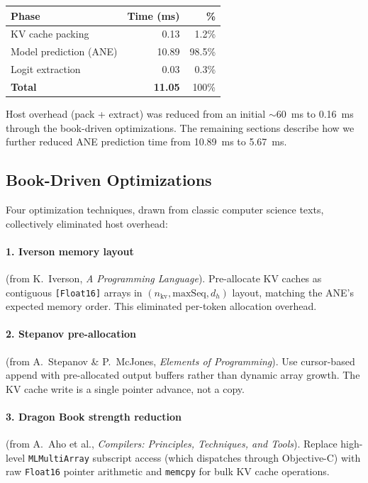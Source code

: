 \documentclass[11pt,twocolumn]{article}
\begin{document}
\begin{center}
\footnotesize
\begin{tabular}{lrr}
\toprule
\textbf{Phase} & \textbf{Time (ms)} & \textbf{\%} \\
\midrule
KV cache packing & 0.13 & 1.2\% \\
Model prediction (ANE) & 10.89 & 98.5\% \\
Logit extraction & 0.03 & 0.3\% \\
\midrule
\textbf{Total} & \textbf{11.05} & 100\% \\
\bottomrule
\end{tabular}
\end{center}

Host overhead (pack + extract) was reduced from an initial
$\sim$60~ms to 0.16~ms through the book-driven optimizations.
The remaining sections describe how we further reduced ANE
prediction time from 10.89~ms to 5.67~ms.

\subsection{Book-Driven Optimizations}

Four optimization techniques, drawn from classic computer science
texts, collectively eliminated host overhead:

\paragraph{1. Iverson memory layout} (from K.~Iverson, \textit{A
Programming Language}). Pre-allocate KV caches as contiguous
\texttt{[Float16]} arrays in $(n_\text{kv}, \text{maxSeq}, d_h)$
layout, matching the ANE's expected memory order. This eliminated
per-token allocation overhead.

\paragraph{2. Stepanov pre-allocation} (from A.~Stepanov \& P.~McJones,
\textit{Elements of Programming}). Use cursor-based append with
pre-allocated output buffers rather than dynamic array growth. The KV
cache write is a single pointer advance, not a copy.

\paragraph{3. Dragon Book strength reduction} (from A.~Aho et al.,
\textit{Compilers: Principles, Techniques, and Tools}). Replace
high-level \texttt{MLMultiArray} subscript access (which dispatches
through Objective-C) with raw \texttt{Float16} pointer arithmetic and
\texttt{memcpy} for bulk KV cache operations.
\end{document}
